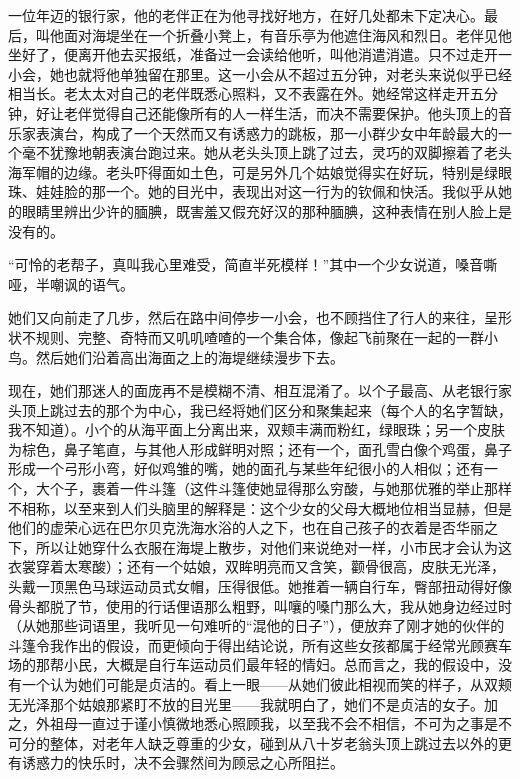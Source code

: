 \par 一位年迈的银行家，他的老伴正在为他寻找好地方，在好几处都未下定决心。最后，叫他面对海堤坐在一个折叠小凳上，有音乐亭为他遮住海风和烈日。老伴见他坐好了，便离开他去买报纸，准备过一会读给他听，叫他消遣消遣。只不过走开一小会，她也就将他单独留在那里。这一小会从不超过五分钟，对老头来说似乎已经相当长。老太太对自己的老伴既悉心照料，又不表露在外。她经常这样走开五分钟，好让老伴觉得自己还能像所有的人一样生活，而决不需要保护。他头顶上的音乐家表演台，构成了一个天然而又有诱惑力的跳板，那一小群少女中年龄最大的一个毫不犹豫地朝表演台跑过来。她从老头头顶上跳了过去，灵巧的双脚擦着了老头海军帽的边缘。老头吓得面如土色，可是另外几个姑娘觉得实在好玩，特别是绿眼珠、娃娃脸的那一个。她的目光中，表现出对这一行为的钦佩和快活。我似乎从她的眼睛里辨出少许的腼腆，既害羞又假充好汉的那种腼腆，这种表情在别人脸上是没有的。
\par “可怜的老帮子，真叫我心里难受，简直半死模样！”其中一个少女说道，嗓音嘶哑，半嘲讽的语气。
\par 她们又向前走了几步，然后在路中间停步一小会，也不顾挡住了行人的来往，呈形状不规则、完整、奇特而又叽叽喳喳的一个集合体，像起飞前聚在一起的一群小鸟。然后她们沿着高出海面之上的海堤继续漫步下去。
\par 现在，她们那迷人的面庞再不是模糊不清、相互混淆了。以个子最高、从老银行家头顶上跳过去的那个为中心，我已经将她们区分和聚集起来（每个人的名字暂缺，我不知道）。小个的从海平面上分离出来，双颊丰满而粉红，绿眼珠；另一个皮肤为棕色，鼻子笔直，与其他人形成鲜明对照；还有一个，面孔雪白像个鸡蛋，鼻子形成一个弓形小弯，好似鸡雏的嘴，她的面孔与某些年纪很小的人相似；还有一个，大个子，裹着一件斗篷（这件斗篷使她显得那么穷酸，与她那优雅的举止那样不相称，以至来到人们头脑里的解释是：这个少女的父母大概地位相当显赫，但是他们的虚荣心远在巴尔贝克洗海水浴的人之下，也在自己孩子的衣着是否华丽之下，所以让她穿什么衣服在海堤上散步，对他们来说绝对一样，小市民才会认为这衣裳穿着太寒酸）；还有一个姑娘，双眸明亮而又含笑，颧骨很高，皮肤无光泽，头戴一顶黑色马球运动员式女帽，压得很低。她推着一辆自行车，臀部扭动得好像骨头都脱了节，使用的行话俚语那么粗野，叫嚷的嗓门那么大，我从她身边经过时（从她那些词语里，我听见一句难听的“混他的日子”），便放弃了刚才她的伙伴的斗篷令我作出的假设，而更倾向于得出结论说，所有这些女孩都属于经常光顾赛车场的那帮小民，大概是自行车运动员们最年轻的情妇。总而言之，我的假设中，没有一个认为她们可能是贞洁的。看上一眼——从她们彼此相视而笑的样子，从双颊无光泽那个姑娘那紧盯不放的目光里——我就明白了，她们不是贞洁的女子。加之，外祖母一直过于谨小慎微地悉心照顾我，以至我不会不相信，不可为之事是不可分的整体，对老年人缺乏尊重的少女，碰到从八十岁老翁头顶上跳过去以外的更有诱惑力的快乐时，决不会骤然间为顾忌之心所阻拦。
